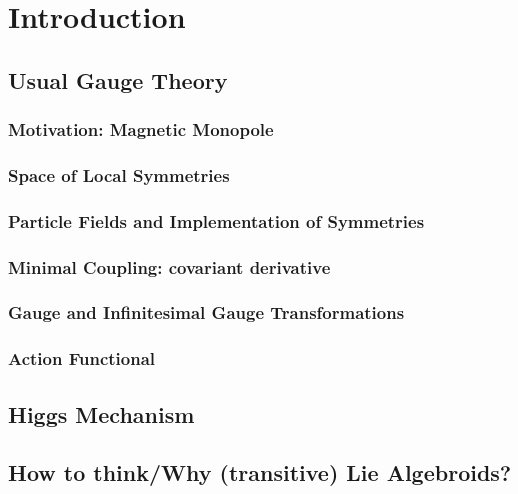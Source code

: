 \documentclass[12pt]{report}
\theoremstyle{definition}
\begin{document}
\chapter{Introduction}\label{chp:intro}


\section{Usual Gauge Theory}
\subsection{Motivation: Magnetic Monopole}

\subsection{Space of Local Symmetries}

\subsection{Particle Fields and Implementation of Symmetries}

\subsection{Minimal Coupling: covariant derivative}

\subsection{Gauge and Infinitesimal Gauge Transformations}

\subsection{Action Functional}

\section{Higgs Mechanism}

\section{How to think/Why (transitive) Lie Algebroids?}
\end{document}
